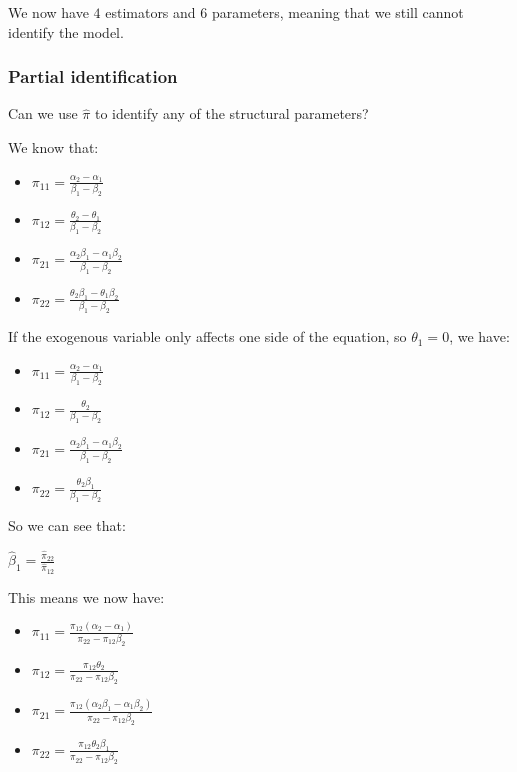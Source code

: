 We now have \(4\) estimators and \(6\) parameters, meaning that we still cannot identify the model.

\subsubsection{Partial identification}

Can we use \(\hat \pi \) to identify any of the structural parameters?

We know that:

\begin{itemize}
\item \(\pi_{11} =\frac{\alpha_2 -\alpha_1 }{\beta_1-\beta_2}\)
\item \(\pi_{12} =\frac{\theta_2-\theta_1}{\beta_1-\beta_2}\)
\item \(\pi_{21} =\frac{\alpha_2\beta_1-\alpha_1\beta_2}{\beta_1-\beta_2}\)
\item \(\pi_{22} =\frac{\theta_2\beta_1-\theta_1\beta_2}{\beta_1-\beta_2} \)
\end{itemize}

If the exogenous variable only affects one side of the equation, so \(\theta_1=0\), we have:

\begin{itemize}
\item \(\pi_{11} =\frac{\alpha_2 -\alpha_1 }{\beta_1-\beta_2}\)
\item \(\pi_{12} =\frac{\theta_2}{\beta_1-\beta_2}\)
\item \(\pi_{21} =\frac{\alpha_2\beta_1-\alpha_1\beta_2}{\beta_1-\beta_2}\)
\item \(\pi_{22} =\frac{\theta_2\beta_1}{\beta_1-\beta_2} \)
\end{itemize}

So we can see that:

\(\hat \beta_1 = \frac{\hat \pi_{22}}{\hat \pi_{12}}\)

This means we now have:

\begin{itemize}
\item \(\pi_{11} =\frac{\pi_{12}(\alpha_2 -\alpha_1 )}{\pi_{22}-\pi_{12}\beta_2}\)
\item \(\pi_{12} =\frac{\pi_{12}\theta_2}{\pi_{22}-\pi_{12}\beta_2}\)
\item \(\pi_{21} =\frac{\pi_{12}(\alpha_2\beta_1-\alpha_1\beta_2)}{\pi_{22}-\pi_{12}\beta_2}\)
\item \(\pi_{22} =\frac{\pi_{12}\theta_2\beta_1}{\pi_{22}-\pi_{12}\beta_2}\)
\end{itemize}

